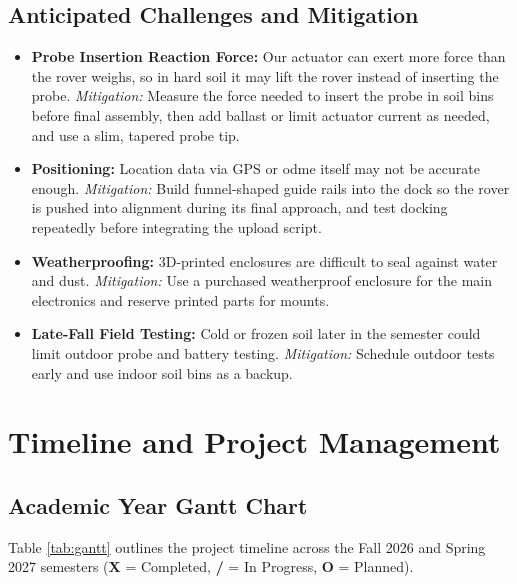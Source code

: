 \documentclass[12pt, letterpaper]{article}
\begin{document}
\subsection{Anticipated Challenges and Mitigation}
\begin{itemize}
    \item \textbf{Probe Insertion Reaction Force:} Our actuator can exert more force than the rover weighs, so in hard soil it may lift the rover instead of inserting the probe. \textit{Mitigation:} Measure the force needed to insert the probe in soil bins before final assembly, then add ballast or limit actuator current as needed, and use a slim, tapered probe tip.
    \item \textbf{Positioning:} Location data via GPS or odme itself may not be accurate enough. \textit{Mitigation:} Build funnel-shaped guide rails into the dock so the rover is pushed into alignment during its final approach, and test docking repeatedly before integrating the upload script.
    \item \textbf{Weatherproofing:} 3D-printed enclosures are difficult to seal against water and dust. \textit{Mitigation:} Use a purchased weatherproof enclosure for the main electronics and reserve printed parts for mounts.
    \item \textbf{Late-Fall Field Testing:} Cold or frozen soil later in the semester could limit outdoor probe and battery testing. \textit{Mitigation:} Schedule outdoor tests early and use indoor soil bins as a backup.
\end{itemize}

\section{Timeline and Project Management}

\subsection{Academic Year Gantt Chart}
Table \ref{tab:gantt} outlines the project timeline across the Fall 2026 and Spring 2027 semesters (\textbf{X} = Completed, \textbf{/} = In Progress, \textbf{O} = Planned).
\end{document}
